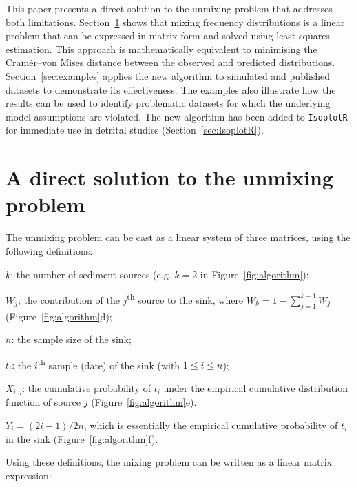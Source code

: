 \documentclass{article}
\begin{document}
This paper presents a direct solution to the unmixing problem that
addresses both limitations. Section~\ref{sec:solution} shows that
mixing frequency distributions is a linear problem that can be
expressed in matrix form and solved using least squares
estimation. This approach is mathematically equivalent to minimising
the Cram\'{e}r--von Mises distance between the observed and predicted
distributions. Section~\ref{sec:examples} applies the new algorithm to
simulated and published datasets to demonstrate its effectiveness. The
examples also illustrate how the results can be used to identify
problematic datasets for which the underlying model assumptions are
violated. The new algorithm has been added to \texttt{IsoplotR}
\citep{vermeesch2018c} for immediate use in detrital studies
(Section~\ref{sec:IsoplotR}).

\section{A direct solution to the unmixing problem}\label{sec:solution}

The unmixing problem can be cast as a linear system of three matrices,
using the following definitions:

\begin{description}
\item{$k$:} the number of sediment sources (e.g. $k=2$ in
  Figure~\ref{fig:algorithm});
\item{$W_j$;} the contribution of the $j$\textsuperscript{th} source
  to the sink, where $W_k = 1 - \sum_{j=1}^{k-1} W_j$
  (Figure~\ref{fig:algorithm}d);
\item{$n$:} the sample size of the sink;
\item{$t_i$:} the $i$\textsuperscript{th} sample (date) of the sink
  (with $1\leq{i}\leq{n}$);
\item{$X_{i,j}$:} the cumulative probability of $t_i$ under the
  empirical cumulative distribution function of source $j$
  (Figure~\ref{fig:algorithm}e).
\item{$Y_{i} = (2i-1)/2n$}, which is essentially the empirical
  cumulative probability of $t_i$ in the sink
  (Figure~\ref{fig:algorithm}f).
\end{description}

Using these definitions, the mixing problem can be written as a linear
matrix expression:
\end{document}
